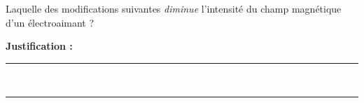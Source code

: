 Laquelle des modifications suivantes \emph{diminue} l'intensité du champ magnétique d'un électroaimant ?

\choices

\noindent\textbf{Justification :} \hrulefill \\[2.5ex]
\rule{\linewidth}{0.4pt} \\[2.5ex]
\rule{\linewidth}{0.4pt}
\vfill
